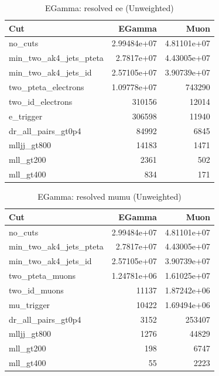 \documentclass{article}
\begin{document}
\begin{table}[htbp]
\centering
\caption{EGamma: resolved ee (Unweighted)}
\begin{tabular}{lrr}
\hline
Cut & EGamma & Muon \\
\hline
no\_cuts & 2.99484e+07 & 4.81101e+07 \\
min\_two\_ak4\_jets\_pteta & 2.7817e+07 & 4.43005e+07 \\
min\_two\_ak4\_jets\_id & 2.57105e+07 & 3.90739e+07 \\
two\_pteta\_electrons & 1.09778e+07 & 743290 \\
two\_id\_electrons & 310156 & 12014 \\
e\_trigger & 306598 & 11940 \\
dr\_all\_pairs\_gt0p4 & 84992 & 6845 \\
mlljj\_gt800 & 14183 & 1471 \\
mll\_gt200 & 2361 & 502 \\
mll\_gt400 & 834 & 171 \\
\hline
\end{tabular}
\end{table}

\begin{table}[htbp]
\centering
\caption{EGamma: resolved mumu (Unweighted)}
\begin{tabular}{lrr}
\hline
Cut & EGamma & Muon \\
\hline
no\_cuts & 2.99484e+07 & 4.81101e+07 \\
min\_two\_ak4\_jets\_pteta & 2.7817e+07 & 4.43005e+07 \\
min\_two\_ak4\_jets\_id & 2.57105e+07 & 3.90739e+07 \\
two\_pteta\_muons & 1.24781e+06 & 1.61025e+07 \\
two\_id\_muons & 11137 & 1.87242e+06 \\
mu\_trigger & 10422 & 1.69494e+06 \\
dr\_all\_pairs\_gt0p4 & 3152 & 253407 \\
mlljj\_gt800 & 1276 & 44829 \\
mll\_gt200 & 198 & 6747 \\
mll\_gt400 & 55 & 2223 \\
\hline
\end{tabular}
\end{table}
\end{document}
